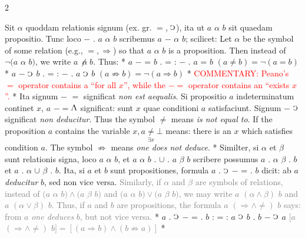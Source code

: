 \documentclass{book}
\newcommand{\C}{\mathop{\sbox0{$\displaystyle$$\reflectbox{C}$} %
\raisebox{-\height+\ht0-0.05cm}[\ht0][\dp0]{\scalebox{0.8}[0.8]{\copy0}}}\displaylimits} %
\newcommand{\abs}{\mathop{\rotatebox[origin=c]{180}{V}}}
\renewcommand{\rightarrow}{\Rightarrow}
\newcommand\irrelevant[1]{\textcolor{gray}{#1}}
\newcommand\commentary[1]{\textcolor{red}{COMMENTARY: #1}}
\newenvironment{translateTwoCol}
               { %
                 \columnratio{0.5, 0.5}
                 \begin{paracol}{2}
                 \newcommand{\LAT}{\switchcolumn[0]*}
                 \newcommand{\ENG}{\switchcolumn[1]}
               }
               { %
                 \let\ENG\undefined
                 \let\LAT\undefined
                 \end{paracol}
               }
\begin{document}
\begin{translateTwoCol}
\quad Sit $\alpha$ quoddam relationis signum (ex. gr. $=$, $\C$), ita ut $a$ $\alpha$ $b$ sit quaedam propositio. Tunc loco $-$ . $a$ $\alpha$ $b$ scribemus $a$ $-$ $\alpha$ $b$; scilicet:
\ENG
\quad Let $\alpha$ be the symbol of some relation (e.g., $=, \rightarrow$) so that $a$ $\alpha$ $b$ is a proposition. Then instead of $\neg(a$ $\alpha$ $b)$, we write $a$ $\not\mathrel{\,\alpha\!}$ $b$. Thus:
\LAT
\hspace{1.06cm} $a$ $-$ = $b$ . = : $-$ . $a$ = $b$
\ENG
\hspace{1.06cm} $(a \not= b) = \neg (a=b)$
\LAT
\hspace{1.06cm} $a$ $-$ $\C$ $b$ . = : $-$ . $a$ $\C$ $b$
\ENG
\hspace{1.06cm} $ (a \not\rightarrow b) = \neg (a \rightarrow b)$
\LAT
\ENG
\commentary{Peano's $=$ operator contains a ``for all $x$'', while the $-=$\scalebox{0.7}{$x$} operator contains an ``exists $x$''.}
\LAT
\quad Ita signum $-$ $=$ significat \emph{non est aequalis}. Si propositio $a$ indeterminatum continet $x$, $a$ $-=$\thinspace $\abs$ significat: sunt $x$ quae conditioni $a$ satisfaciunt. Signum $-$ $\C$ significat \emph{non deducitur}.
\ENG
Thus the symbol $\not=$ means \emph{is not equal to}. If the proposition $a$ contains the variable $x, a\underset{\exists x}\neq \bot$ means: there is an $x$ which satisfies condition $a$. The symbol $\not\rightarrow$ means \emph{one does not deduce}.
\LAT
\quad Similter, si $\alpha$ et $\beta$ sunt relationis signa, loco $a$ $\alpha$ $b$, et $a$ $\alpha$ $b$ . $\cup$ . $a$ $\beta$ $b$ scribere possumus $a$ . $\alpha$ $\beta$ . $b$ et $a$ . $\alpha$ $\cup$ $\beta$ . $b$. Ita, si $a$ et $b$ sunt propositiones, formula $a$ . $\C$ $-$ = . $b$ dicit: ab $a$ \emph{deducitur} $b$, sed non vice versa.
\ENG
\quad \irrelevant{Similarly, if $\alpha$ and $\beta$ are symbols of relations, instead of $(a$ $\alpha$ $b) \wedge (a$ $\beta$ $b)$ and $(a$ $\alpha$ $b) \vee (a$ $\beta$ $b)$, we may write $a$ $(\alpha \wedge \beta)$ $b$ and $a$ $(\alpha \vee \beta)$ $b$. Thus, if $a$ and $b$ are propositions, the formula $a$ $(\rightarrow \wedge \not=)$ $b$ says: from $a$ \emph{one deduces} $b$, but not vice versa.}
\LAT
\hspace{1.06cm} $a$ . $\C$ $-$ = . $b$ : = : $a$ $\C$ $b$ . $b$ $-$ $\C$ $a$
\ENG
\hspace{1.06cm} \irrelevant{ $[a$ $(\rightarrow \wedge \not=)$ $b] = [(a \rightarrow b) \wedge (b \not\rightarrow a)]$ }
\LAT

\end{translateTwoCol}
\end{document}
